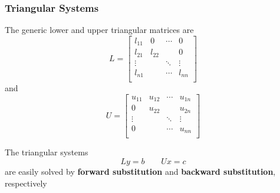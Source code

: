 \documentclass[10pt]{beamer}
\begin{document}
\begin{frame}
\frametitle{Triangular Systems}

The generic lower and upper triangular matrices are
\begin{equation*}
    L = \begin{bmatrix} l_{11} &   0    & \cdots &   0    \\
                        l_{21} & l_{22} &        &   0    \\
                        \vdots &        & \ddots & \vdots \\
                        l_{n1} &        & \cdots & l_{nn} \\
        \end{bmatrix}
\end{equation*}
and
\begin{equation*}
    U = \begin{bmatrix} u_{11} & u_{12} & \cdots & u_{1n} \\
                           0   & u_{22} &        & u_{2n}  \\
                        \vdots &        & \ddots & \vdots \\
                           0   &        & \cdots & u_{nn} \\
        \end{bmatrix}
\end{equation*}

The triangular systems
\begin{equation*}
    Ly = b \ \ \ \ \ \ \ \ \ Ux = c
\end{equation*}
are easily solved by \textbf{forward substitution} and
\textbf{backward substitution}, respectively

\end{frame}
\end{document}
